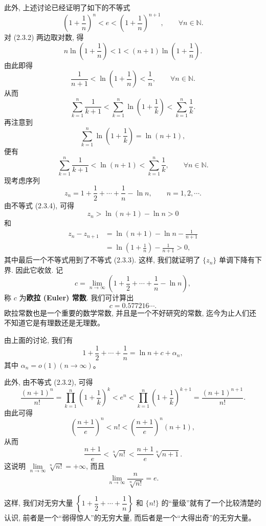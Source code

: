 \documentclass[UTF8,12pt,a4paper,fontset=fandol]{ctexart}
\begin{document}
此外, 上述讨论已经证明了如下的不等式
\begin{equation}
  \left(1+\frac1n\right)^n
  <
  e
  <
  \left(1+\frac1n\right)^{n+1},
  \qquad \forall n\in\mathbb{N}.
  \tag{2.3.2}
\end{equation}
对 (2.3.2) 两边取对数, 得
\[
  n\ln\left(1+\frac1n\right)
  <
  1
  <
  (n+1)\ln\left(1+\frac1n\right).
\]
由此即得
\begin{equation}
  \frac1{n+1}
  <
  \ln\left(1+\frac1n\right)
  <
  \frac1n,\qquad \forall n\in\mathbb{N}.
  \tag{2.3.3}
\end{equation}
从而
\[
  \sum_{k=1}^n\frac1{k+1}
  <
  \sum_{k=1}^n\ln\left(1+\frac1k\right)
  <
  \sum_{k=1}^n\frac1k.
\]
再注意到
\[
  \sum_{k=1}^n\ln\left(1+\frac1k\right)=\ln(n+1),
\]
便有
\begin{equation}
  \sum_{k=1}^n\frac1{k+1}
  <
  \ln(n+1)
  <
  \sum_{k=1}^n\frac1k,\qquad \forall n\in\mathbb{N}.
  \tag{2.3.4}
\end{equation}
现考虑序列
\[
  z_n=1+\frac12+\cdots+\frac1n-\ln n,\qquad n=1,2,\cdots.
\]
由不等式 (2.3.4), 可得
\[
  z_n>\ln(n+1)-\ln n>0
\]
和
\[
\begin{aligned}
  z_n-z_{n+1}
  &=
  \ln(n+1)-\ln n-\frac1{n+1}\\
  &=
  \ln\left(1+\frac1n\right)-\frac1{n+1}>0,
\end{aligned}
\]
其中最后一个不等式用到了不等式 (2.3.3). 这样, 我们就证明了 $\{z_n\}$ 单调下降有下界. 因此它收敛. 记
\[
  c=\lim_{n\to\infty}\left(1+\frac12+\cdots+\frac1n-\ln n\right),
\]
称 $c$ 为\textbf{欧拉 (Euler) 常数}. 我们可计算出
\[
  c=0.577216\cdots.
\]
欧拉常数也是一个重要的数学常数, 并且是一个不好研究的常数, 迄今为止人们还不知道它是有理数还是无理数。

由上面的讨论, 我们有
\[
  1+\frac12+\cdots+\frac1n=\ln n+c+\alpha_n,
\]
其中 $\alpha_n=o(1)(n\to\infty)$。

此外, 由不等式 (2.3.2), 可得
\[
  \frac{(n+1)^n}{n!}
  =
  \prod_{k=1}^n\left(1+\frac1k\right)^k
  <
  e^n
  <
  \prod_{k=1}^n\left(1+\frac1k\right)^{k+1}
  =
  \frac{(n+1)^{n+1}}{n!}.
\]
由此可得
\[
  \left(\frac{n+1}{e}\right)^n<n!<\left(\frac{n+1}{e}\right)^n(n+1),
\]
从而
\[
  \frac{n+1}{e}<\sqrt[n]{n!}<\frac{n+1}{e}\sqrt[n]{n+1}.
\]
这说明 $\lim\limits_{n\to\infty}\sqrt[n]{n!}=+\infty$, 而且
\[
  \lim_{n\to\infty}\frac n{\sqrt[n]{n!}}=e.
\]

这样, 我们对无穷大量 $\left\{1+\dfrac12+\cdots+\dfrac1n\right\}$ 和 $\{n!\}$ 的``量级''就有了一个比较清楚的认识, 前者是一个``弱得惊人''的无穷大量, 而后者是一个``大得出奇''的无穷大量。
\end{document}
